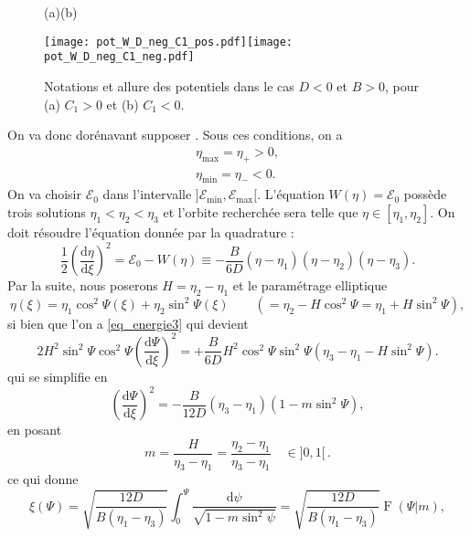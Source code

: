 \documentclass[10pt,a4paper, oneside, fleqn]{myarticle}
\newcommand{\dd}{\mathrm{d}}
\newcommand{\Ecal}{\mathcal{E}}
\DeclareMathOperator{\ellipF}{F}
\begin{document}
\begin{figure}[ht!]
  \centering
  \quad(a)\hspace*{6cm}(b)
  
  \texttt{[image: pot\_W\_D\_neg\_C1\_pos.pdf]}\texttt{[image: pot\_W\_D\_neg\_C1\_neg.pdf]}
  \caption{Notations et allure des potentiels dans le cas $D<0$ et $B>0$, pour (a) $C_1>0$ et (b) $C_1<0$.}\label{D_neg_fig_pot_W}
\end{figure}



On va donc dorénavant supposer . Sous ces conditions, on a 
\begin{gather}
  \eta_{\max} = \eta_+ >0,\\
  \eta_{\min} = \eta_- < 0.
\end{gather}
On va choisir $\Ecal_0$ dans l'intervalle $]\Ecal_{\min}, \Ecal_{\max}[$. L'équation $W(\eta) = \Ecal_0$ possède trois solutions $\eta_1<\eta_2<\eta_3$ et l'orbite recherchée sera telle que $\eta\in[\eta_1, \eta_2]$. On doit résoudre l'équation donnée par la quadrature :
\begin{equation}
   \frac 1 2 \left( \frac{\dd \eta}{\dd \xi} \right)^2 = \Ecal_0-W(\eta) \equiv -\frac{B}{6D} (\eta - \eta_1) (\eta - \eta_2) (\eta - \eta_3). \label{eq_energie3}
\end{equation}
Par la suite, nous poserons $H=\eta_2-\eta_1$ et le paramétrage elliptique
\begin{equation}
  \eta(\xi) = \eta_1 \cos^2\Psi(\xi) +  \eta_2 \sin^2\Psi(\xi) \qquad(=\eta_2 - H\cos^2\Psi=\eta_1+H\sin^2\Psi),
\end{equation}
si bien que l'on a \eqref{eq_energie3} qui devient
\begin{equation}
   2H^2 \sin^2\Psi \cos^2\Psi \left(\frac{\dd \Psi}{\dd \xi}\right)^2 = +\frac{B}{6D} H^2 \cos^2\Psi \sin^2 \Psi (\eta_3-\eta_1 - H \sin^2\Psi). 
\end{equation}
qui se simplifie en
\begin{equation}
  \left(\frac{\dd \Psi}{\dd \xi}\right)^2 = -\frac{B}{12D}(\eta_3-\eta_1)(1-m\sin^2\Psi),
\end{equation}
en posant
\begin{equation}
  \boxed{m = \frac{H}{\eta_3-\eta_1}= \frac{\eta_2-\eta_1}{\eta_3-\eta_1} \quad\in]0,1[}\,.
\end{equation}
ce qui donne
\begin{equation}
  \xi(\Psi) = \sqrt{\frac{12D}{B (\eta_1-\eta_3)}} \int_0^{\Psi}\frac{\dd \psi}{\sqrt{1 - m\sin^2\psi}}=\sqrt{\frac{12D}{B (\eta_1-\eta_3)}} \ellipF(\Psi\vert m),
\end{equation}
\end{document}

